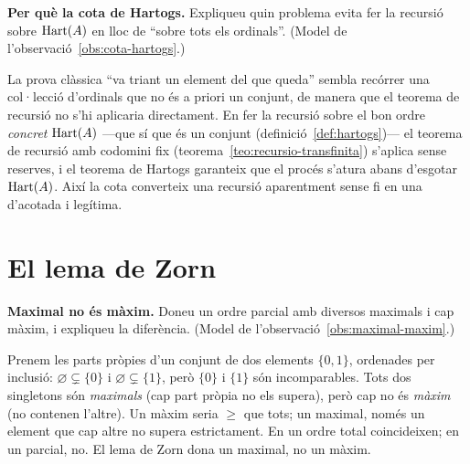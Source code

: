 \begin{exercici}
\textbf{Per què la cota de Hartogs.} Expliqueu quin problema evita fer la recursió sobre \(\operatorname{Hart}(A)\) en lloc de \enquote{sobre tots els ordinals}. (Model de l'observació~\ref{obs:cota-hartogs}.)
\end{exercici}
\begin{solucio}
La prova clàssica \enquote{va triant un element del que queda} sembla recórrer una col·lecció d'ordinals que no és a priori un conjunt, de manera que el teorema de recursió no s'hi aplicaria directament. En fer la recursió sobre el bon ordre \emph{concret} \(\operatorname{Hart}(A)\) ---que sí que és un conjunt (definició~\ref{def:hartogs})--- el teorema de recursió amb codomini fix (teorema~\ref{teo:recursio-transfinita}) s'aplica sense reserves, i el teorema de Hartogs garanteix que el procés s'atura abans d'esgotar \(\operatorname{Hart}(A)\). Així la cota converteix una recursió aparentment sense fi en una d'acotada i legítima.
\end{solucio}

\section{El lema de Zorn}\label{prac:zorn}

\begin{exercici}
\textbf{Maximal no és màxim.} Doneu un ordre parcial amb diversos maximals i cap màxim, i expliqueu la diferència. (Model de l'observació~\ref{obs:maximal-maxim}.)
\end{exercici}
\begin{solucio}
Prenem les parts pròpies d'un conjunt de dos elements \(\{0,1\}\), ordenades per inclusió: \(\varnothing\subsetneq\{0\}\) i \(\varnothing\subsetneq\{1\}\), però \(\{0\}\) i \(\{1\}\) són incomparables. Tots dos singletons són \emph{maximals} (cap part pròpia no els supera), però cap no és \emph{màxim} (no contenen l'altre). Un màxim seria \(\ge\) que tots; un maximal, només un element que cap altre no supera estrictament. En un ordre total coincideixen; en un parcial, no. El lema de Zorn dona un maximal, no un màxim.
\end{solucio}

